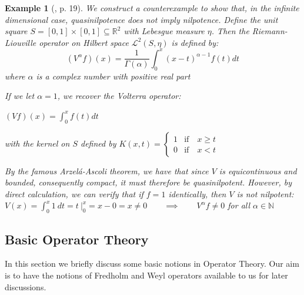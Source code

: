 \documentclass[12pt, oneside]{book}
\newtheorem{example}[theorem]{Example}
\begin{document}
\begin{example}[\cite{A}, p. 19] 
\normalfont
\noindent We construct a counterexample to show that, in the infinite dimensional case, quasinilpotence does not imply nilpotence. Define the unit square $S=[0,1] \times [0,1] \subseteq \mathbb{R}^2$ with Lebesgue measure $\eta$. Then the Riemann-Liouville operator on Hilbert space $\mathcal{L}^{2}(S,\eta)$ is defined by: $$(V^{\alpha}f)(x)= \frac{1}{\Gamma(\alpha)} \int_{0}^{x} (x-t)^{\alpha-1} f(t) dt $$ where $\alpha$ is a complex number with positive real part
\vskip 0.3cm

\noindent If we let $\alpha=1$, we recover the Volterra operator: 
\begin{center}
$(V f)(x)=\int_{0}^{x}f(t) dt$
\end{center}

with the kernel on $S$ defined by  $K(x,t)= \begin{cases} 
							      						1 & \text{if} \quad x \geq t \\
      													0 & \text{if} \quad x < t
							   							\end{cases}$

\vskip 0.3cm
\noindent By the famous Arzel{\'a}-Ascoli theorem, we have that since $V$ is equicontinuous and bounded, consequently compact, it must therefore be quasinilpotent. However, by direct calculation, we can verify that if $f=1$ identically, then $V$ is not nilpotent:
\vskip 0.3cm
\noindent $\displaystyle{ V(x)=\int_0^x 1\ dt = t\ \Big|_0^x =x-0 = x \not = 0} \qquad \implies \qquad V^{\alpha}f \not = 0$ for all $\alpha \in \mathbb{N}$

\end{example}



\subsection{Basic Operator Theory}

\noindent In this section we briefly discuss some basic notions in Operator Theory. Our aim is to have
the notions of Fredholm and Weyl operators available to us for later discussions. 
\vskip 0.3cm
\end{document}
